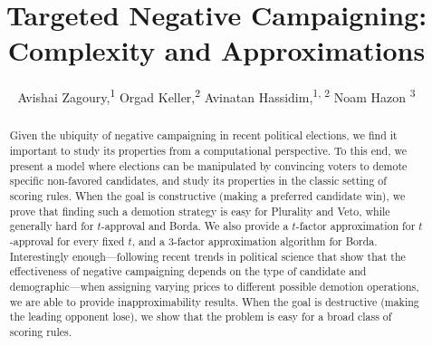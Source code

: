 \documentclass[letterpaper]{article} %
\begin{document}
\title{Targeted Negative Campaigning: Complexity and Approximations}
\author{Avishai Zagoury,\textsuperscript{\rm 1} Orgad Keller,\textsuperscript{\rm 2} Avinatan Hassidim,\textsuperscript{\rm 1, \rm2} Noam Hazon \textsuperscript{\rm 3}\\}
\maketitle
\begin{abstract}
Given the ubiquity of negative campaigning in recent political elections, we find it important to study its properties from a computational perspective. To this end, we present a model where elections can be manipulated by convincing voters to demote specific non-favored candidates, and study its properties in the classic setting of scoring rules.
When the goal is constructive (making a preferred candidate win),  we prove that finding such a demotion strategy is easy for Plurality and Veto, while generally hard for $t$-approval and Borda. We also provide a $t$-factor approximation for $t$-approval for every fixed $t$, and a 3-factor approximation algorithm for Borda. Interestingly enough---following recent trends in  political science that show that the effectiveness of negative campaigning depends on the type of candidate and demographic---when assigning varying prices to different possible demotion operations, we are able to provide inapproximability results.
When the goal is destructive (making the leading opponent lose), we show that the problem is easy for a broad class of scoring rules.
\end{abstract}
\end{document}
